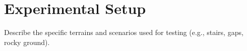 \section{Experimental Setup}

\begin{outline}
  Describe the specific terrains and scenarios used for testing
  (e.g., stairs, gaps, rocky ground).
\end{outline}
